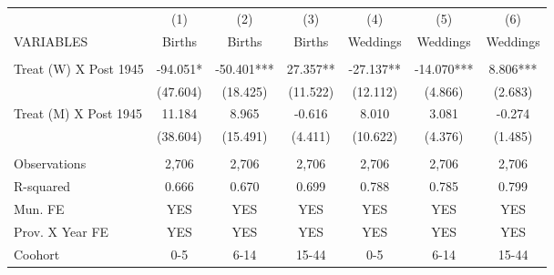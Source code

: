 \begin{tabular}{lcccccc} \hline
 & (1) & (2) & (3) & (4) & (5) & (6) \\
VARIABLES & Births & Births & Births & Weddings & Weddings & Weddings \\ \hline
 &  &  &  &  &  &  \\
Treat (W) X Post 1945 & -94.051* & -50.401*** & 27.357** & -27.137** & -14.070*** & 8.806*** \\
 & (47.604) & (18.425) & (11.522) & (12.112) & (4.866) & (2.683) \\
Treat (M) X Post 1945 & 11.184 & 8.965 & -0.616 & 8.010 & 3.081 & -0.274 \\
 & (38.604) & (15.491) & (4.411) & (10.622) & (4.376) & (1.485) \\
 &  &  &  &  &  &  \\
Observations & 2,706 & 2,706 & 2,706 & 2,706 & 2,706 & 2,706 \\
R-squared & 0.666 & 0.670 & 0.699 & 0.788 & 0.785 & 0.799 \\
Mun. FE & YES & YES & YES & YES & YES & YES \\
Prov. X Year FE & YES & YES & YES & YES & YES & YES \\
 Coohort & 0-5 & 6-14 & 15-44 & 0-5 & 6-14 & 15-44 \\ \hline
\end{tabular}
